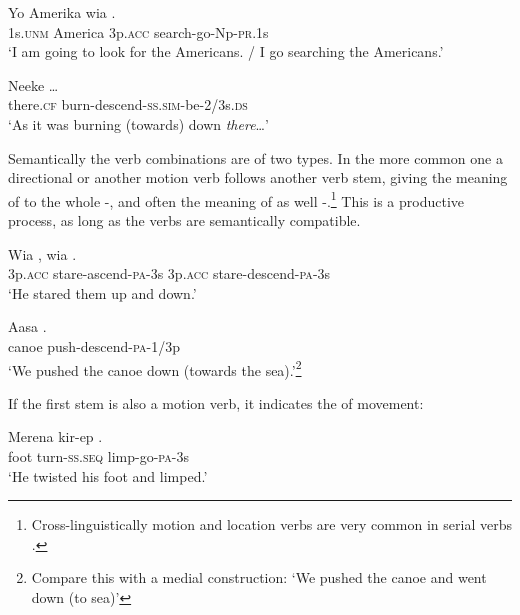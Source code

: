 \ea%
\label{ex:3:x378}
\gll Yo Amerika wia . \\
1s.\textsc{unm} America 3p.\textsc{acc} search-go-Np-\textsc{pr}.1s \\
\glt`I am going to look for the Americans. / I go searching the Americans.' 
\z

\ea%
\label{ex:3:x379}
\gll Neeke  {\dots} \\
there.\textsc{cf} burn-descend-\textsc{ss}.\textsc{sim}-be-2/3s.\textsc{ds}\\
\glt`As it was burning (towards) down \textit{there}{\dots}'
\z

Semantically the verb combinations are of two types. In the more common one a directional or another motion verb follows another verb stem, giving the meaning of  to the whole -, and often the meaning of  as well -.\footnote{Cross-linguistically motion and location verbs are very common in serial verbs \citep[9]{Lord1993}.} This is a productive process, as long as the verbs are semantically compatible.

\ea%
\label{ex:3:x438}
\gll Wia , wia . \\
3p.\textsc{acc} stare-ascend-\textsc{pa}-3s 3p.\textsc{acc} stare-descend-\textsc{pa}-3s\\
\glt`He stared them up and down.'
\z

\ea%
\label{ex:3:x381}
\gll Aasa . \\
canoe push-descend-\textsc{pa}-1/3p \\
\glt`We pushed the canoe down (towards the sea).'\footnote{Compare this with a medial construction:  `We pushed the canoe and went down (to sea)'}
\z

If the first stem is also a motion verb, it indicates the  of movement:

\ea%
\label{ex:3:x380}
\gll Merena kir-ep . \\
foot turn-\textsc{ss}.\textsc{seq} limp-go-\textsc{pa}-3s \\
\glt`He twisted his foot and limped.'
\z

